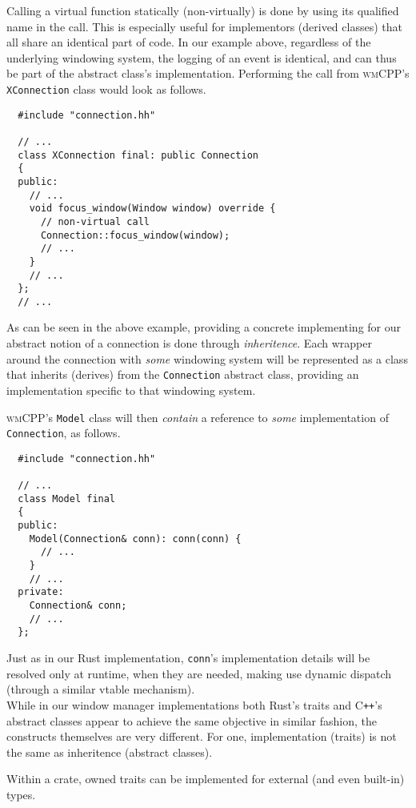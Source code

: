Calling  a virtual  function statically  (non-virtually)  is done  by using  its
qualified name in the call. This  is especially useful for implementors (derived
classes)  that all  share  an identical  part  of code.  In  our example  above,
regardless  of the  underlying  windowing system,  the logging  of  an event  is
identical,  and  can  thus  be  part of  the  abstract  class's  implementation.
Performing  the call  from \textsc{wmCPP}'s  \texttt{XConnection} class
would look as follows.

\begin{verbatim}
  #include "connection.hh"

  // ...
  class XConnection final: public Connection
  {
  public:
    // ...
    void focus_window(Window window) override {
      // non-virtual call
      Connection::focus_window(window);
      // ...
    }
    // ...
  };
  // ...
\end{verbatim}

As  can be  seen in  the above  example, providing  a concrete  implementing for
our  abstract  notion of  a  connection  is done  through  \textit{inheritence}.
Each  wrapper   around  the  connection  with   \textit{some}  windowing  system
will   be  represented   as   a   class  that   inherits   (derives)  from   the
\texttt{Connection}   abstract  class,   providing  an   implementation
specific to that windowing system.

\textsc{wmCPP}'s  \texttt{Model}  class  will then  \textit{contain}  a
reference  to \textit{some}  implementation of  \texttt{Connection}, as
follows.

\begin{verbatim}
  #include "connection.hh"

  // ...
  class Model final
  {
  public:
    Model(Connection& conn): conn(conn) {
      // ...
    }
    // ...
  private:
    Connection& conn;
    // ...
  };
\end{verbatim}

Just  as in  our  Rust  implementation, \texttt{conn}'s  implementation
details  will be  resolved only  at runtime,  when they  are needed,  making use
dynamic dispatch (through a similar vtable mechanism).\\


While   in  our   window  manager   implementations  both   Rust's  traits   and
C\texttt{++}'s abstract classes appear to  achieve the same objective in similar
fashion, the constructs  themselves are very different.  For one, implementation
(traits) is not the same as inheritence (abstract classes).

Within a crate, owned traits can be implemented for external (and even built-in)
types.
